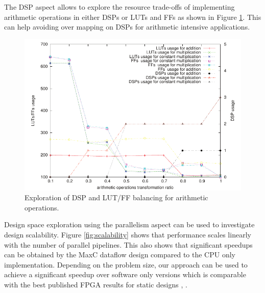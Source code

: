 The DSP aspect allows to explore the resource trade-offs of
implementing arithmetic operations in either DSPs or LUTs and FFs as
shown in Figure \ref{fig:arith}. This can help avoiding over mapping
on DSPs for arithmetic intensive applications.

\begin{figure}[!h]
\includegraphics[scale=0.7]{figs/arith}
\caption{Exploration of DSP and LUT/FF balancing for arithmetic
  operations.}
\label{fig:arith}
\end{figure}

Design space exploration using the parallelism aspect can be used to
investigate design scalability. Figure \ref{fig:scalability} shows
that performance scales linearly with the number of parallel
pipelines. This also shows that significant speedups can be obtained
by the MaxC dataflow design compared to the CPU only
implementation. Depending on the problem size, our approach can be
used to achieve a significant speedup over software only versions
which is comparable with the best published FPGA results for static
designs \cite{Xinyu:Qiwei:Luk:Qiang:Pell:2012},
\cite{araya2011assessing}.





